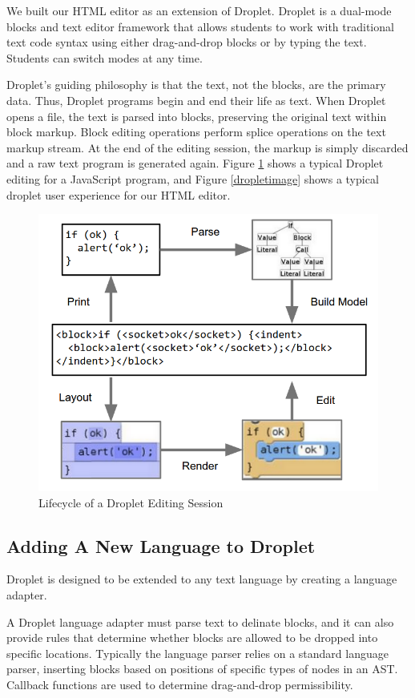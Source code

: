 \documentclass[conference]{IEEEtran}
\begin{document}
We built our HTML editor as an extension of Droplet.  Droplet \cite{Droplet} is a dual-mode blocks and text editor framework that allows students to work with traditional text code syntax using either drag-and-drop blocks or by typing the text.  Students can switch modes at any time.

Droplet's guiding philosophy is that the text, not the blocks, are the primary data. Thus, Droplet programs begin and end their life as text. When Droplet opens a file, the text is parsed into blocks, preserving the original text within block markup. Block editing operations perform splice operations on the text markup stream. At the end of the editing session, the markup is simply discarded and a raw text program is generated again. Figure \ref{lifecycle} shows a typical Droplet editing for a JavaScript program, and Figure \ref{dropletimage} shows a typical droplet user experience for our HTML editor.

\begin{figure}
\centering
\includegraphics[width=0.6\columnwidth]{droplet-arch.png}
\caption{Lifecycle of a Droplet Editing Session}
\label{lifecycle}
\end{figure}

\subsection{Adding A New Language to Droplet}

Droplet is designed to be extended to any text language by creating a language adapter.

A Droplet language adapter must parse text to delinate blocks, and it can also provide rules that determine whether blocks are allowed to be dropped into specific locations.  Typically the language parser relies on a standard language parser, inserting blocks based on positions of specific types of nodes in an AST.  Callback functions are used to determine drag-and-drop permissibility.
\end{document}
